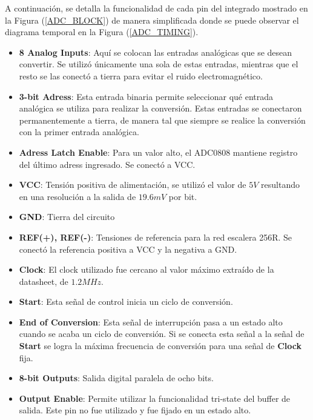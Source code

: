 A continuación, se detalla la funcionalidad de cada pin del integrado mostrado en la Figura (\ref{ADC_BLOCK}) de manera simplificada donde se puede observar el diagrama temporal en la Figura (\ref{ADC_TIMING}).

\begin{itemize}
\item \textbf{8 Analog Inputs}: Aquí se colocan las entradas analógicas que se desean convertir. Se utilizó únicamente una sola de estas entradas, mientras que el resto se las conectó a tierra para evitar el ruido electromagnético.
\item \textbf{3-bit Adress}: Esta entrada binaria permite seleccionar qué entrada analógica se utiliza para realizar la conversión. Estas entradas se conectaron permanentemente a tierra, de manera tal que siempre se realice la conversión con la primer entrada analógica.
\item \textbf{Adress Latch Enable}: Para un valor alto, el ADC0808 mantiene registro del último adress ingresado. Se conectó a VCC.
\item \textbf{VCC}: Tensión positiva de alimentación, se utilizó el valor de $5V$ resultando en una resolución a la salida de $19.6mV$ por bit.
\item \textbf{GND}: Tierra del circuito
\item \textbf{REF(+), REF(-)}: Tensiones de referencia para la red escalera 256R. Se conectó la referencia positiva a VCC y la negativa a GND.
\item \textbf{Clock}: El clock utilizado fue cercano al valor máximo extraído de la datasheet, de $1.2MHz$.
\item \textbf{Start}: Esta señal de control inicia un ciclo de conversión.
\item \textbf{End of Conversion}: Esta señal de interrupción pasa a un estado alto cuando se acaba un ciclo de conversión. Si se conecta esta señal a la señal de \textbf{Start} se logra la máxima frecuencia de conversión para una señal de \textbf{Clock} fija.
\item \textbf{8-bit Outputs}: Salida digital paralela de ocho bits.
\item \textbf{Output Enable}: Permite utilizar la funcionalidad tri-state del buffer de salida. Este pin no fue utilizado y fue fijado en un estado alto.
\end{itemize}

